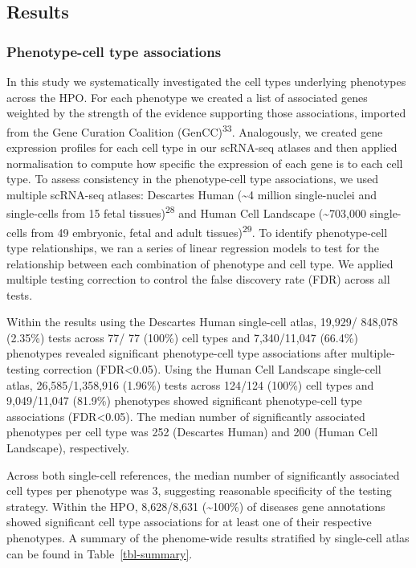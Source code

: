 \documentclass[
]{article}
\begin{document}
\subsection{Results}\label{sec-results}

\subsubsection{Phenotype-cell type
associations}\label{phenotype-cell-type-associations}

In this study we systematically investigated the cell types underlying
phenotypes across the HPO. For each phenotype we created a list of
associated genes weighted by the strength of the evidence supporting
those associations, imported from the Gene Curation Coalition
(GenCC)\textsuperscript{33}. Analogously, we created gene expression
profiles for each cell type in our scRNA-seq atlases and then applied
normalisation to compute how specific the expression of each gene is to
each cell type. To assess consistency in the phenotype-cell type
associations, we used multiple scRNA-seq atlases: Descartes Human
(\textasciitilde4 million single-nuclei and single-cells from 15 fetal
tissues)\textsuperscript{28} and Human Cell Landscape
(\textasciitilde703,000 single-cells from 49 embryonic, fetal and adult
tissues)\textsuperscript{29}. To identify phenotype-cell type
relationships, we ran a series of linear regression models to test for
the relationship between each combination of phenotype and cell type. We
applied multiple testing correction to control the false discovery rate
(FDR) across all tests.

Within the results using the Descartes Human single-cell atlas, 19,929/
848,078 (2.35\%) tests across 77/ 77 (100\%) cell types and 7,340/11,047
(66.4\%) phenotypes revealed significant phenotype-cell type
associations after multiple-testing correction (FDR\textless0.05). Using
the Human Cell Landscape single-cell atlas, 26,585/1,358,916 (1.96\%)
tests across 124/124 (100\%) cell types and 9,049/11,047 (81.9\%)
phenotypes showed significant phenotype-cell type associations
(FDR\textless0.05). The median number of significantly associated
phenotypes per cell type was 252 (Descartes Human) and 200 (Human Cell
Landscape), respectively.

Across both single-cell references, the median number of significantly
associated cell types per phenotype was 3, suggesting reasonable
specificity of the testing strategy. Within the HPO, 8,628/8,631
(\textasciitilde100\%) of diseases gene annotations showed significant
cell type associations for at least one of their respective phenotypes.
A summary of the phenome-wide results stratified by single-cell atlas
can be found in Table~\ref{tbl-summary}.
\end{document}

